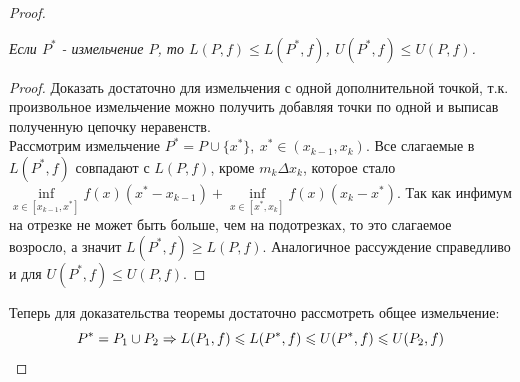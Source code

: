 \begin{proof}
	\begin{lemma}
		\textit{Если $P^*$ - измельчение $P$, то $L(P, f) \leq L(P^*, f)$, $U(P^*, f) \leq U(P, f)$.}
	\end{lemma}

	\begin{proof}
		Доказать достаточно для измельчения с одной дополнительной точкой, т.к. произвольное измельчение можно получить добавляя точки по одной и выписав полученную цепочку неравенств. \\
		Рассмотрим измельчение $P^* = P \cup \{x^*\},\ x^* \in (x_{k - 1}, x_k)$.
		Все слагаемые в $L(P^*, f)$ совпадают с $L(P, f)$, кроме $m_k \Delta x_k$, которое стало $\inf\limits_{x\in [x_{k - 1}, x^*]} f(x)(x^* - x_{k - 1}) + \inf\limits_{x\in[x^*, x_k]}f(x)(x_k - x^*)$. Так как инфимум на отрезке не может быть больше, чем на подотрезках, то это слагаемое возросло, а значит $L(P^*, f) \geq L(P, f)$. Аналогичное рассуждение справедливо и для $U(P^*, f) \leq U(P, f)$. 
	\end{proof}

 Теперь для доказательства теоремы достаточно рассмотреть общее измельчение:
	\[
		P^* = P_1 \cup P_2 \Rightarrow L(P_1, f) \leqslant L(P^*, f) \leqslant U(P^*, f) \leqslant U(P_2, f)
	\]
\end{proof}